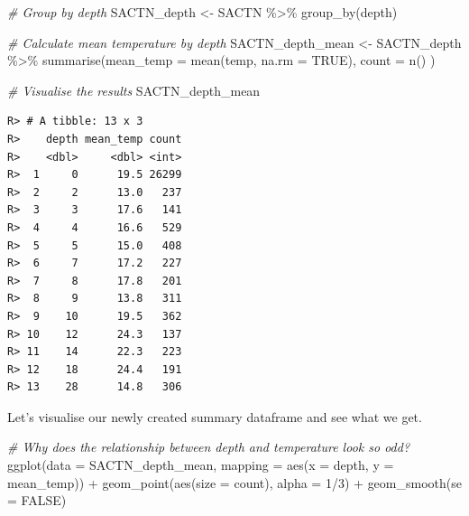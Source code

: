 \documentclass[
]{book}
\newenvironment{Shaded}{\begin{snugshade}}{\end{snugshade}}
\newcommand{\AttributeTok}[1]{\textcolor[rgb]{0.77,0.63,0.00}{#1}}
\newcommand{\CommentTok}[1]{\textcolor[rgb]{0.56,0.35,0.01}{\textit{#1}}}
\newcommand{\ConstantTok}[1]{\textcolor[rgb]{0.00,0.00,0.00}{#1}}
\newcommand{\DecValTok}[1]{\textcolor[rgb]{0.00,0.00,0.81}{#1}}
\newcommand{\FunctionTok}[1]{\textcolor[rgb]{0.00,0.00,0.00}{#1}}
\newcommand{\NormalTok}[1]{#1}
\newcommand{\OtherTok}[1]{\textcolor[rgb]{0.56,0.35,0.01}{#1}}
\newcommand{\SpecialCharTok}[1]{\textcolor[rgb]{0.00,0.00,0.00}{#1}}
\begin{document}
\begin{Shaded}
\begin{Highlighting}[]
\CommentTok{\# Group by depth}
\NormalTok{SACTN\_depth }\OtherTok{\textless{}{-}}\NormalTok{ SACTN }\SpecialCharTok{\%\textgreater{}\%} 
  \FunctionTok{group\_by}\NormalTok{(depth)}

\CommentTok{\# Calculate mean temperature by depth}
\NormalTok{SACTN\_depth\_mean }\OtherTok{\textless{}{-}}\NormalTok{ SACTN\_depth }\SpecialCharTok{\%\textgreater{}\%} 
  \FunctionTok{summarise}\NormalTok{(}\AttributeTok{mean\_temp =} \FunctionTok{mean}\NormalTok{(temp, }\AttributeTok{na.rm =} \ConstantTok{TRUE}\NormalTok{),}
  \AttributeTok{count =} \FunctionTok{n}\NormalTok{()}
\NormalTok{)}

\CommentTok{\# Visualise the results}
\NormalTok{SACTN\_depth\_mean}
\end{Highlighting}
\end{Shaded}

\begin{verbatim}
R> # A tibble: 13 x 3
R>    depth mean_temp count
R>    <dbl>     <dbl> <int>
R>  1     0      19.5 26299
R>  2     2      13.0   237
R>  3     3      17.6   141
R>  4     4      16.6   529
R>  5     5      15.0   408
R>  6     7      17.2   227
R>  7     8      17.8   201
R>  8     9      13.8   311
R>  9    10      19.5   362
R> 10    12      24.3   137
R> 11    14      22.3   223
R> 12    18      24.4   191
R> 13    28      14.8   306
\end{verbatim}

Let's visualise our newly created summary dataframe and see what we get.

\begin{Shaded}
\begin{Highlighting}[]
\CommentTok{\# Why does the relationship between depth and temperature look so odd?}
\FunctionTok{ggplot}\NormalTok{(}\AttributeTok{data =}\NormalTok{ SACTN\_depth\_mean, }\AttributeTok{mapping =} \FunctionTok{aes}\NormalTok{(}\AttributeTok{x =}\NormalTok{ depth, }\AttributeTok{y =}\NormalTok{ mean\_temp)) }\SpecialCharTok{+}
  \FunctionTok{geom\_point}\NormalTok{(}\FunctionTok{aes}\NormalTok{(}\AttributeTok{size =}\NormalTok{ count), }\AttributeTok{alpha =} \DecValTok{1}\SpecialCharTok{/}\DecValTok{3}\NormalTok{) }\SpecialCharTok{+}
  \FunctionTok{geom\_smooth}\NormalTok{(}\AttributeTok{se =} \ConstantTok{FALSE}\NormalTok{)}
\end{Highlighting}
\end{Shaded}
\end{document}
